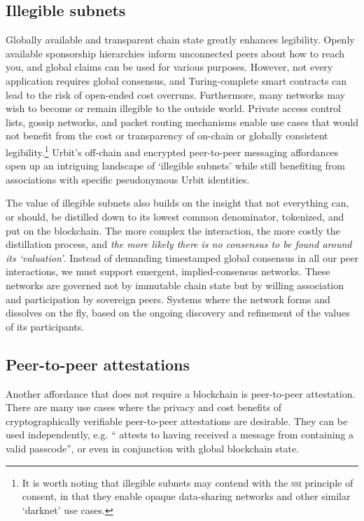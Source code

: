 \documentclass[twoside]{article}
\begin{document}
\subsection{Illegible subnets}

Globally available and transparent chain state greatly enhances legibility. Openly available sponsorship hierarchies inform unconnected peers about how to reach you, and global claims can be used for various purposes. However, not every application requires global consensus, and Turing-complete smart contracts can lead to the risk of open-ended cost overruns.  Furthermore, many networks may wish to become or remain illegible to the outside world. Private access control lists, gossip networks, and packet routing mechanisms enable use cases that would not benefit from the cost or transparency of on-chain or globally consistent legibility.\footnote{It is worth noting that illegible subnets may contend with the \textsc{ssi} principle of consent, in that they enable opaque data-sharing networks and other similar `darknet' use cases.} Urbit's off-chain and encrypted peer-to-peer messaging affordances open up an intriguing landscape of `illegible subnets' while still benefiting from associations with specific pseudonymous Urbit identities.

The value of illegible subnets also builds on the insight that not everything can, or should, be distilled down to its lowest common denominator, tokenized, and put on the blockchain. The more complex the interaction, the more costly the distillation process, and \emph{the more likely there is no consensus to be found around its `valuation'}. Instead of demanding timestamped global consensus in all our peer interactions, we must support emergent, implied-consensus networks. These networks are governed not by immutable chain state but by willing association and participation by sovereign peers. Systems where the network forms and dissolves on the fly, based on the ongoing discovery and refinement of the values of its participants.

\subsection{Peer-to-peer attestations}

Another affordance that does not require a blockchain is peer-to-peer attestation. There are many use cases where the privacy and cost benefits of cryptographically verifiable peer-to-peer attestations are desirable. They can be used independently, e.g. `` attests to having received a message from  containing a valid passcode'', or even in conjunction with global blockchain state.
\end{document}
